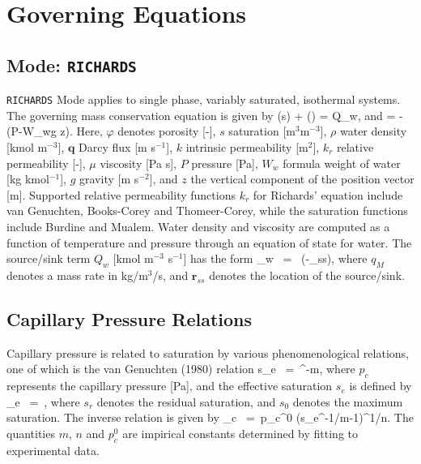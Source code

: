 \documentclass[12pt]{article}
\def\EQ#1\EN{\begin{equation}#1\end{equation}}
\newcommand{\eq}{\ =\ }
\newcommand{\p}{{\partial}}
\newcommand{\bnabla}{\boldsymbol{\nabla}}
\newcommand{\bq}{\boldsymbol{q}}
\newcommand{\br}{\boldsymbol{r}}
\begin{document}
\section{Governing Equations}

\setcounter{equation}{0}

\subsection{Mode: {\tt RICHARDS}}

{\tt RICHARDS} Mode applies to single phase, variably saturated, isothermal systems. The governing mass conservation equation is given by
\EQ
\frac{\p}{\p t}\left(\varphi s\rho\right) + \bnabla\cdot\left(\rho\bq\right) = Q_w,
\EN
and
\EQ
\bq = -\bnabla\left(P-W_w\rho g z\right).
\EN
Here, $\varphi$ denotes porosity [-], 
$s$ saturation [m$^3$m$^{-3}$], 
$\rho$ water density [kmol m$^{-3}$], 
$\bq$ Darcy flux [m s$^{-1}$], 
$k$ intrinsic permeability [m$^2$], 
$k_r$ relative permeability [-], 
$\mu$ viscosity [Pa s], 
$P$ pressure [Pa], 
$W_w$ formula weight of water [kg kmol$^{-1}$], 
$g$ gravity [m s$^{-2}$], and 
$z$ the vertical component of the position vector [m].  
Supported relative permeability functions $k_r$ for Richards' equation include van Genuchten, Books-Corey and Thomeer-Corey, while the saturation functions include Burdine and Mualem.  Water density and viscosity are computed as a function of temperature and pressure through an equation of state for water. The source/sink term $Q_w$ [kmol m$^{-3}$ s$^{-1}$] has the form
\EQ
Q_w \eq {} \delta(\br-\br_{ss}),
\EN
where $q_M$ denotes a mass rate in kg/m$^{3}$/s, and $\br_{ss}$ denotes the location of the source/sink.

\subsection{Capillary Pressure Relations}

Capillary pressure is related to saturation by various 
phenomenological relations, one of which is the van Genuchten 
(1980) relation 
\EQ\label{seff}
s_e \eq {}^{-m}, 
\EN 
where $p_c$ represents the capillary pressure [Pa], and the effective saturation $s_e$ is defined by 
\EQ 
s_e \eq {}, 
\EN 
where $s_r$ denotes the residual saturation, and $s_0$ denotes 
the maximum saturation. 
The inverse relation is given by
\EQ
p_c \eq p_c^0 \left(s_e^{-1/m}-1\right)^{1/n}.
\EN
The quantities $m$, $n$ and $p_c^0$ are impirical constants determined by fitting to experimental data.
\end{document}
